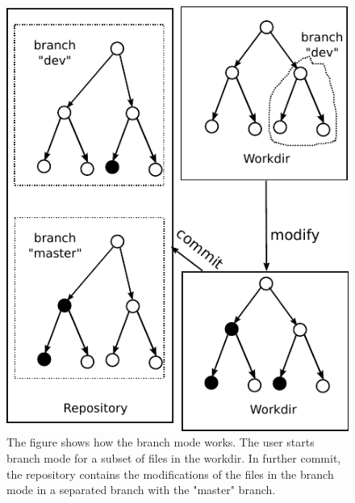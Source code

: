 \begin{figure}[t]
\centerline{\includegraphics{fig/branchmode.pdf}}
\caption{The figure shows how the branch mode works. The user starts branch mode
for a subset of files in the workdir. In further commit, the repository contains
the modifications of the files in the branch mode in a separated branch with the
"master" branch.
}

\label{f:branch}
\end{figure}

\endinput


